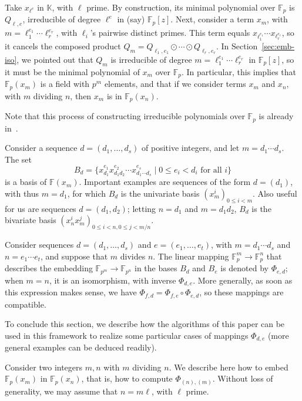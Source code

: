 \documentclass{sig-alternate}
\def\F {\ensuremath{\mathbb{F}}}
\def\K {\ensuremath{\mathbb{K}}}
\newcounter{algo}
\begin{document}
Take $x_{\ell^{e}}$ in $\K$, with $\ell$ prime. By construction, its
minimal polynomial over $\F_p$ is $Q_{\ell,e}$, irreducible of degree
$\ell^{e}$ in (say) $\F_p[z]$. Next, consider a term $x_m$, with
$m=\ell_1^{e_1}\cdots \ell_r^{e_r}$, with $\ell_i$'s pairwise distinct
primes. This term equals $x_{\ell_1^{e_1}} \cdots x_{\ell_r^{e_r}}$,
so it cancels the composed product $Q_{m}=Q_{\ell_1,e_1} \odot \cdots
\odot Q_{\ell_r,e_r}.$ In Section~\ref{sec:emb-iso}, we pointed out
that $Q_m$ is irreducible of degree $m=\ell_1^{e_1}\cdots
\ell_r^{e_r}$ in $\F_p[z]$, so it must be the minimal polynomial of
$x_m$ over $\F_p$.  In particular, this implies that $\F_p(x_m)$ is a
field with $p^m$ elements, and that if we consider terms $x_m$ and
$x_n$, with $m$ dividing $n$, then $x_m$ is in $\F_p(x_n)$.

Note that this process of constructing irreducible polynomials over
$\F_p$ is already in~\cite{Shoup90,shoup94,couveignes+lercier11}.

\smallskip{}
Consider a sequence $d=(d_1,\dots,d_s)$ of positive integers, and let
$m=d_1 \cdots d_s$. The set
$$B_d = \{ x_{d_1}^{e_1} x_{d_1 d_2}^{e_2} \cdots x_{d_1 \cdots
  d_s}^{e_s} \mid 0 \le e_i < d_i \text{~for all $i$}\}$$ is a basis
of $\F(x_m)$. Important examples are sequences of the form $d=(d_1)$,
with thus $m=d_1$, for which $B_d$ is the univariate basis $(x_m^i)_{0
  \le i < m}$. Also useful for us are sequences $d=(d_1,d_2)$; letting
$n=d_1$ and $m=d_1 d_2$, $B_d$ is the bivariate basis $(x_n^i
x_m^j)_{0 \le i < n, 0 \le j < m/n}$.

Consider sequences $d=(d_1,\dots,d_s)$ and $e=(e_1,\dots,e_t)$, with
$m=d_1 \cdots d_s$ and $n=e_1 \cdots e_t$, and suppose that $m$
divides $n$. The linear mapping $\F_p^m \to \F_p^n$ that describes the
embedding $\F_{p^m} \to \F_{p^n}$ in the bases $B_d$ and $B_e$ is
denoted by $\Phi_{e,d}$; when $m=n$, it is an isomorphism, with
inverse $\Phi_{d,e}$. More generally, as soon as this expression makes
sense, we have $\Phi_{f,d} = \Phi_{f,e}\circ \Phi_{e,d}$, so these
mappings are compatible.

To conclude this section, we describe how the algorithms of this paper
can be used in this framework to realize some particular cases of
mappings $\Phi_{d,e}$ (more general examples can be deduced readily).

\smallskip{} Consider two integers $m,n$
with $m$ dividing $n$. We describe here how to embed $\F_p(x_m)$ in
$\F_p(x_n)$, that is, how to compute $\Phi_{(n),(m)}$. Without loss of
generality, we may assume that $n = m\ell$, with $\ell$ prime.
\end{document}
